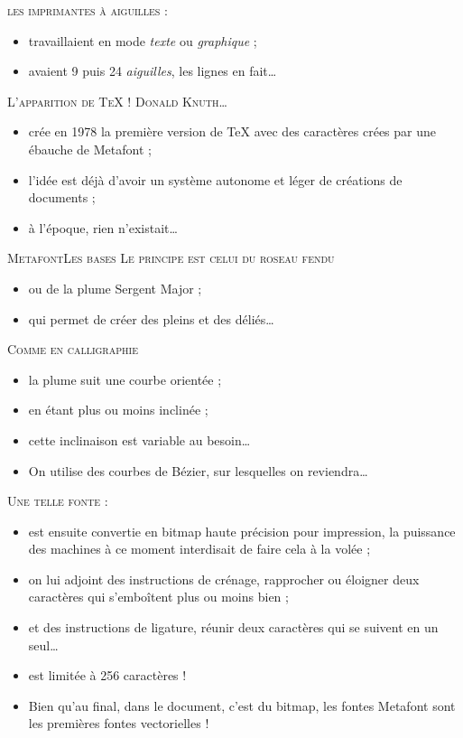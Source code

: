 \documentclass[12pt,a4paper,twocolumn]{book} %
\begin{document}
	{\textsc{les imprimantes à aiguilles :}}
	\begin{itemize}
	\item travaillaient en mode \textit{texte} ou \textit{graphique} ;
	\item avaient 9 puis 24 \textit{aiguilles}, les lignes en fait\dots
	\end{itemize}
	    {\textsc{L'apparition de TeX !}
	      {\textsc{Donald \textsc{Knuth}\dots}}
	      \begin{itemize}
	      \item crée en 1978 la première version de TeX avec des caractères crées par une ébauche de Metafont ;
	      \item l'idée est déjà d'avoir un système autonome et léger de créations de documents ;
	      \item à l'époque, rien n'existait\dots
	      \end{itemize}
	          {\textsc{MetafontLes bases}
	            {\textsc{Le principe est celui du roseau fendu}}
		    \begin{itemize}
		    \item ou de la plume Sergent Major ;
		    \item qui permet de créer des pleins et des déliés\dots
		    \end{itemize}

	            {\textsc{Comme en calligraphie}}
		    \begin{itemize}
		    \item la plume suit une courbe orientée ;
		    \item en étant plus ou moins inclinée ;
		    \item cette inclinaison est variable au besoin\dots
		    \item On utilise des courbes de Bézier, sur lesquelles on reviendra\dots
		    \end{itemize}

                    {\textsc{Une telle fonte :}}
		    \begin{itemize}
		    \item est ensuite convertie en bitmap haute précision pour impression,
		      la puissance des machines à ce moment interdisait de faire cela à la volée ;
		    \item on lui adjoint des instructions de crénage, rapprocher ou éloigner deux caractères
		      qui s'emboîtent plus ou moins bien ;
		    \item et des instructions de ligature, réunir deux caractères qui se suivent en un seul\dots
		    \item est limitée à 256 caractères !
		    \item Bien qu'au final, dans le document, c'est du bitmap, les fontes Metafont sont les premières fontes vectorielles !
		    \end{itemize}

}}
\end{document}
